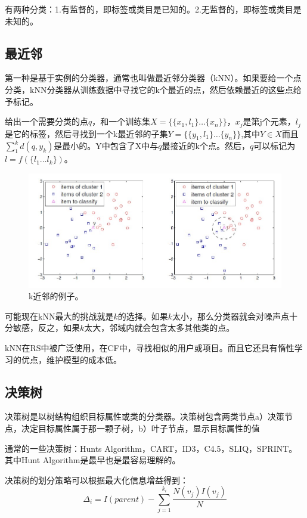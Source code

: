 \documentclass{article}
\begin{document}
有两种分类：1.有监督的，即标签或类目是已知的。2.无监督的，即标签或类目是未知的。

\subsection{最近邻}
第一种是基于实例的分类器，通常也叫做最近邻分类器（kNN）。如果要给一个点分类，kNN分类器从训练数据中寻找它的k个最近的点，然后依赖最近的这些点给予标记。

给出一个需要分类的点$q$，和一个训练集$ X=\{\{x_1,l_1\}\dots\{x_n\}\} $，$x_j$是第j个元素，$l_j$是它的标签，然后寻找到一个k最近邻的子集$ Y=\{\{y_1,l_1\}\dots\{y_n\}\} $,其中$Y\in X$而且$\sum_1^kd(q,y_k)$是最小的。Y中包含了X中与$q$最接近的k个点。然后，$q$可以标记为$l=f(\{l_1\dots l_k\})$。
\begin{figure}[!htb]
	  \begin{center}
	  	\includegraphics[scale=0.5]{f2.4.jpg}
	  	\caption{k近邻的例子。}
	  \end{center}
\end{figure}

可能现在kNN最大的挑战就是$k$的选择。如果$k$太小，那么分类器就会对噪声点十分敏感，反之，如果$k$太大，邻域内就会包含太多其他类的点。

kNN在RS中被广泛使用，在CF中，寻找相似的用户或项目。而且它还具有惰性学习的优点，维护模型的成本低。

\subsection{决策树}
决策树是以树结构组织目标属性或类的分类器。决策树包含两类节点a）决策节点，决定目标属性属于那一颗子树，b）叶子节点，显示目标属性的值

通常的一些决策树：Hunts Algorithm，CART，ID3，C4.5，SLIQ，SPRINT。其中Hunt Algorithm是最早也是最容易理解的。

决策树的划分策略可以根据最大化信息增益得到：
$$ \Delta_i=I(parent)-\mathop{\sum}\limits_{j=1}^{k_i}\frac{N(v_j)I(v_j)}{N} $$
\end{document}
